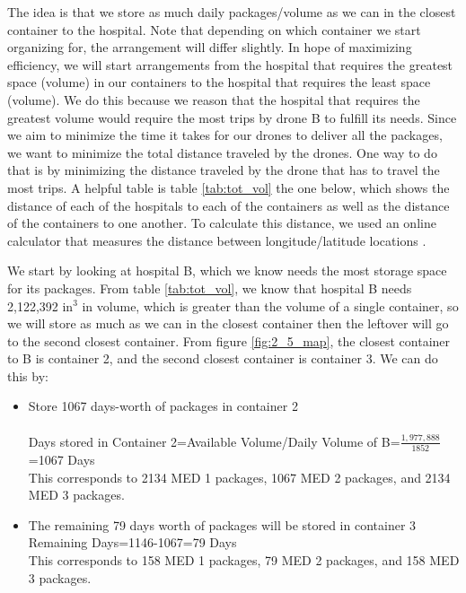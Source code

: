 The idea is that we store as much daily packages/volume as we can in the closest container to the hospital. Note that depending on which container we start organizing for, the arrangement will differ slightly. In hope of  maximizing efficiency, we will start arrangements from the hospital that requires the greatest space (volume) in our containers to the hospital that requires the least space (volume). We do this because we reason that the hospital that requires the greatest volume would require the most trips by drone B to fulfill its needs. Since we aim to minimize the time it takes for our drones to deliver all the packages, we want to minimize the total distance traveled by the drones. One way to do that is by minimizing the distance traveled by the drone that has to travel the most trips. A helpful table is table \ref{tab:tot_vol} the one below, which shows the distance of each of the hospitals to each of the containers as well as the distance of the containers to one another. To calculate this distance, we used an online calculator that measures the distance between longitude/latitude locations \cite{dist_calc}.



We start by looking at hospital B, which we know needs the most storage space for its packages. From table \ref{tab:tot_vol}, we know that hospital B needs 2,122,392 in$^3$ in volume, which is greater than the volume of a single container, so we will store as much as we can in the closest container then the leftover will go to the second closest container. From figure \ref{fig:2_5_map}, the closest container to B is container 2, and the second closest container is container 3. We can do this by: 

\begin{itemize}
\item Store 1067 days-worth of packages in container 2\\
\\Days stored in Container 2=Available Volume/Daily Volume of B=$\frac{1,977,888}{1852}$=1067 Days \\
This corresponds to 2134 MED 1 packages, 1067 MED 2 packages, and 2134 MED 3 packages. 
\item The remaining 79 days worth of packages will be stored in container 3\\
Remaining Days=1146-1067=79 Days\\
This corresponds to 158 MED 1 packages, 79 MED 2 packages, and 158 MED 3 packages. 
\end{itemize}

